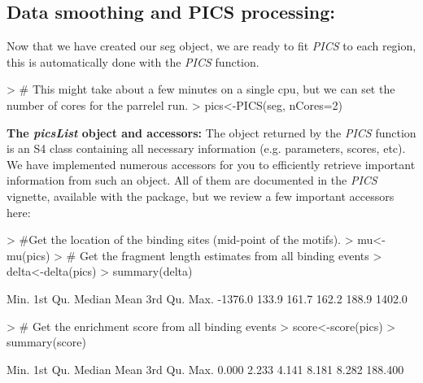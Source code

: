 \documentclass[12pt]{article}
\newcommand{\Rfunction}[1]{{\textit{#1}}}
\newcommand{\Rclass}[1]{{\textit{#1}}}
\begin{document}
\subsection{Data smoothing and PICS processing:}
Now that we have created our seg object, we are ready to fit \Rfunction{PICS} to each region, this is automatically done with the \Rfunction{PICS} function.

\begin{Schunk}
\begin{Sinput}
> # This might take about a few minutes on a single cpu, but we can set the number of cores for the parrelel run. 
> pics<-PICS(seg, nCores=2)
\end{Sinput}
\end{Schunk}
\noindent\textbf{The \Rclass{picsList} object and accessors:} 
The object returned by the \Rfunction{PICS} function is an S4 class containing all necessary information (e.g. parameters, scores, etc). We have implemented numerous accessors for you to efficiently retrieve important information from such an object. All of them are documented in the \Rfunction{PICS} vignette, available with the package, but we review a few important accessors here:
\begin{Schunk}
\begin{Sinput}
> #Get the location of the binding sites (mid-point of the motifs).
> mu<-mu(pics)
> # Get the fragment length estimates from all binding events
> delta<-delta(pics)
> summary(delta)
\end{Sinput}
\begin{Soutput}
   Min. 1st Qu.  Median    Mean 3rd Qu.    Max. 
-1376.0   133.9   161.7   162.2   188.9  1402.0 
\end{Soutput}
\begin{Sinput}
> # Get the enrichment score from all binding events
> score<-score(pics)
> summary(score)
\end{Sinput}
\begin{Soutput}
   Min. 1st Qu.  Median    Mean 3rd Qu.    Max. 
  0.000   2.233   4.141   8.181   8.282 188.400 
\end{Soutput}
\end{Schunk}
\end{document}
